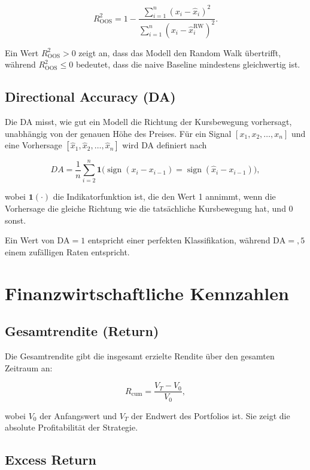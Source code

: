 \[
    R^2_{\mathrm{OOS}} = 1 - \frac{\sum_{i=1}^{n}{(x_i - \hat{x}_i)}^2}
    {\sum_{i=1}^{n}{(x_i - \hat{x}^{\text{RW}}_i)}^2}.
\]

Ein Wert $R^2_{\mathrm{OOS}} > 0$ zeigt an, dass das Modell den Random Walk übertrifft, während $R^2_{\mathrm{OOS}} \leq 0$ bedeutet, dass die naive Baseline mindestens gleichwertig ist.

\subsection*{Directional Accuracy (DA)}

Die \ac{DA} misst, wie gut ein Modell die Richtung der Kursbewegung vorhersagt, unabhängig von der genauen Höhe des Preises. Für ein Signal \( [x_1, x_2, \dots, x_n] \) und eine Vorhersage \( [\hat{x}_1, \hat{x}_2, \dots, \hat{x}_n] \) wird \ac{DA} definiert nach

\[
    DA = \frac{1}{n} \sum_{i=2}^{n} \mathbf{1}\Big(\operatorname{sign}(x_i - x_{i-1}) = \operatorname{sign}(\hat{x}_i - x_{i-1})\Big),
\]

wobei \(\mathbf{1}(\cdot)\) die Indikatorfunktion ist, die den Wert 1 annimmt, wenn die Vorhersage die gleiche Richtung wie die tatsächliche Kursbewegung hat, und 0 sonst.

Ein Wert von \(\text{DA} = 1\) entspricht einer perfekten Klassifikation, während \(\text{DA} = {,}5\) einem zufälligen Raten entspricht.

\section{Finanzwirtschaftliche Kennzahlen}\label{sec:app_finanzkennzahlen}

\subsection*{Gesamtrendite (Return)}

Die Gesamtrendite gibt die insgesamt erzielte Rendite über den gesamten Zeitraum an:

\[
    R_{\mathrm{cum}} = \frac{V_T - V_0}{V_0},
\]

wobei \(V_0\) der Anfangswert und \(V_T\) der Endwert des Portfolios ist. Sie zeigt die absolute Profitabilität der Strategie.

\subsection*{Excess Return}

